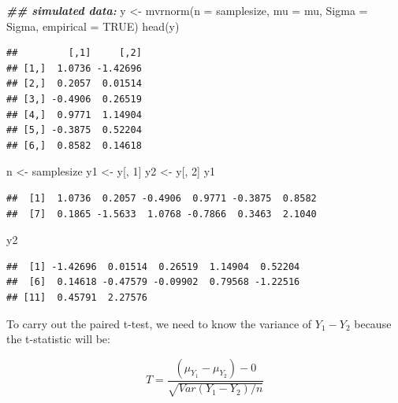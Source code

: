 \documentclass[
  12pt,
]{krantz}
\newenvironment{Shaded}{\begin{snugshade}}{\end{snugshade}}
\newcommand{\AttributeTok}[1]{\textcolor[rgb]{0.77,0.63,0.00}{#1}}
\newcommand{\ConstantTok}[1]{\textcolor[rgb]{0.00,0.00,0.00}{#1}}
\newcommand{\DecValTok}[1]{\textcolor[rgb]{0.00,0.00,0.81}{#1}}
\newcommand{\DocumentationTok}[1]{\textcolor[rgb]{0.56,0.35,0.01}{\textbf{\textit{#1}}}}
\newcommand{\FunctionTok}[1]{\textcolor[rgb]{0.00,0.00,0.00}{#1}}
\newcommand{\NormalTok}[1]{#1}
\newcommand{\OtherTok}[1]{\textcolor[rgb]{0.56,0.35,0.01}{#1}}
\theoremstyle{definition}
\theoremstyle{definition}
\theoremstyle{definition}
\theoremstyle{definition}
\theoremstyle{remark}
\begin{document}
\begin{Shaded}
\begin{Highlighting}[]
\DocumentationTok{\#\# simulated data:}
\NormalTok{y }\OtherTok{\textless{}{-}} \FunctionTok{mvrnorm}\NormalTok{(}\AttributeTok{n =}\NormalTok{ samplesize, }\AttributeTok{mu =}\NormalTok{ mu, }\AttributeTok{Sigma =}\NormalTok{ Sigma, }
             \AttributeTok{empirical =} \ConstantTok{TRUE}\NormalTok{)}
\FunctionTok{head}\NormalTok{(y)}
\end{Highlighting}
\end{Shaded}

\begin{verbatim}
##         [,1]     [,2]
## [1,]  1.0736 -1.42696
## [2,]  0.2057  0.01514
## [3,] -0.4906  0.26519
## [4,]  0.9771  1.14904
## [5,] -0.3875  0.52204
## [6,]  0.8582  0.14618
\end{verbatim}

\begin{Shaded}
\begin{Highlighting}[]
\NormalTok{n }\OtherTok{\textless{}{-}}\NormalTok{ samplesize}
\NormalTok{y1 }\OtherTok{\textless{}{-}}\NormalTok{ y[, }\DecValTok{1}\NormalTok{]}
\NormalTok{y2 }\OtherTok{\textless{}{-}}\NormalTok{ y[, }\DecValTok{2}\NormalTok{]}
\NormalTok{y1}
\end{Highlighting}
\end{Shaded}

\begin{verbatim}
##  [1]  1.0736  0.2057 -0.4906  0.9771 -0.3875  0.8582
##  [7]  0.1865 -1.5633  1.0768 -0.7866  0.3463  2.1040
\end{verbatim}

\begin{Shaded}
\begin{Highlighting}[]
\NormalTok{y2}
\end{Highlighting}
\end{Shaded}

\begin{verbatim}
##  [1] -1.42696  0.01514  0.26519  1.14904  0.52204
##  [6]  0.14618 -0.47579 -0.09902  0.79568 -1.22516
## [11]  0.45791  2.27576
\end{verbatim}

To carry out the paired t-test,
we need to know the variance of \(Y_1-Y_2\) because the t-statistic will be:

\begin{equation}
T = \frac{(\mu_{Y_1} - \mu_{Y_2})-0}{\sqrt{Var(Y_1 - Y_2)/n}}
\end{equation}
\end{document}
